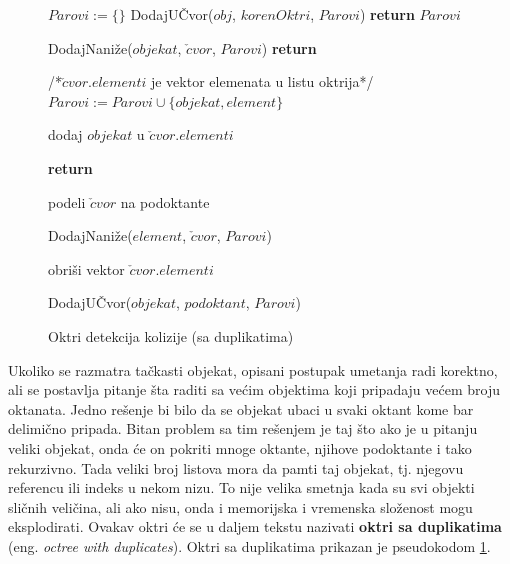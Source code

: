 \documentclass[12pt,oneside]{memoir}
\begin{document}
\begin{figure}[!h]
    \label{alg:octree}
	\begin{algorithmic}[1]
		\State $Parovi := \{ \}$
			\State DodajUČvor($obj$, $korenOktri$, $Parovi$)
		\EndFor
		\State \textbf{return} $Parovi$
		\EndProcedure

			\State DodajNaniže($objekat$, $\check{c}vor$, $Parovi$)
			\State \textbf{return}
		\EndIf		

		/*{$\check{c}vor.elementi$ je vektor elemenata u listu oktrija}*/
				\State $Parovi := Parovi \cup \{objekat, element\}$
			\EndIf		
		\EndFor

		\State dodaj $objekat$ u $\check{c}vor.elementi$

			\State \textbf{return}
		\EndIf	

		\State podeli $\check{c}vor$ na podoktante

			\State DodajNaniže($element$, $\check{c}vor$, $Parovi$)
		\EndFor

		\State obriši vektor $\check{c}vor.elementi$

		\EndProcedure

				\State DodajUČvor($objekat$, $podoktant$, $Parovi$)
			\EndIf	
		\EndFor
		\EndProcedure
	\end{algorithmic}
	\caption{Oktri detekcija kolizije (sa duplikatima)}
\end{figure}

Ukoliko se razmatra tačkasti objekat, opisani postupak umetanja radi korektno,
ali se postavlja pitanje šta raditi sa većim objektima koji pripadaju većem broju oktanata.
Jedno rešenje bi bilo da se objekat ubaci u svaki oktant kome bar delimično pripada.
Bitan problem sa tim rešenjem je taj što ako je u pitanju veliki objekat, onda će on pokriti mnoge oktante, njihove 
podoktante i tako rekurzivno. 
Tada veliki broj listova mora da pamti taj objekat, tj. njegovu referencu ili indeks u nekom nizu.
To nije velika smetnja kada su svi objekti sličnih veličina, ali ako 
nisu, onda i memorijska i vremenska složenost mogu eksplodirati.
Ovakav oktri će se u daljem tekstu nazivati \textbf{oktri sa duplikatima} (eng. {\em octree with duplicates}). 
Oktri sa duplikatima prikazan je pseudokodom \ref{alg:octree}.
\end{document}
